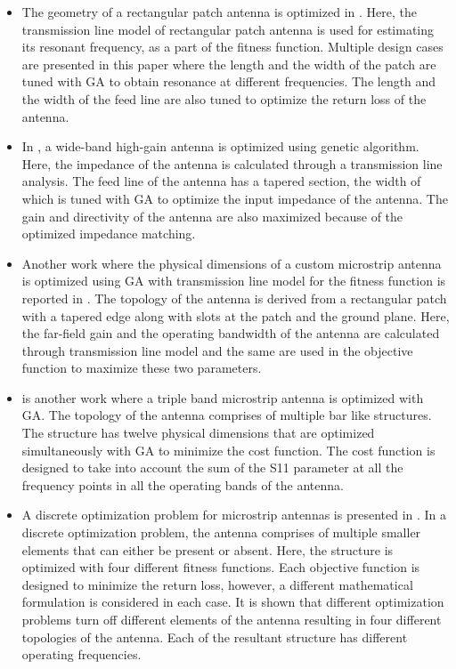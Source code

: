 \begin{itemize}
\item The geometry of a rectangular patch antenna is optimized in \cite{txm_opt}. Here, the transmission line model of rectangular patch antenna is used for estimating its resonant frequency, as a part of the fitness function. Multiple design cases are presented in this paper where the length and the width of the patch are tuned with GA to obtain resonance at different frequencies. The length and the width of the feed line are also tuned to optimize the return loss of the antenna.
\item In \cite{patch_feed_ga}, a wide-band high-gain antenna is optimized using genetic algorithm. Here, the impedance of the antenna is calculated through a transmission line analysis. The feed line of the antenna has a tapered section, the width of which is tuned with GA to optimize the input impedance of the antenna. The gain and directivity of the antenna are also maximized because of the optimized impedance matching.
\item Another work where the physical dimensions of a custom microstrip antenna is optimized using GA with transmission line model for the fitness function is reported in \cite{gain_bw_opt_ga}. The topology of the antenna is derived from a rectangular patch with a tapered edge along with slots at the patch and the ground plane. Here, the far-field gain and the operating bandwidth of the antenna are calculated through transmission line model and the same are used in the objective function to maximize these two parameters.
\item \cite{mpa_triband_opt} is another work where a triple band microstrip antenna is optimized with GA. The topology of the antenna comprises of multiple bar like structures. The structure has twelve physical dimensions that are optimized simultaneously with GA to minimize the cost function. The cost function is designed to take into account the sum of the S11 parameter at all the frequency points in all the operating bands of the antenna.
\item A discrete optimization problem for microstrip antennas is presented in \cite{mpa_multifit_ga}. In a discrete optimization problem, the antenna comprises of multiple smaller elements that can either be present or absent. Here, the structure is optimized with four different fitness functions. Each objective function is designed to minimize the return loss, however, a different mathematical formulation is considered in each case. It is shown that different optimization problems turn off different elements of the antenna resulting in four different topologies of the antenna. Each of the resultant structure has different operating frequencies.

\end{itemize}

